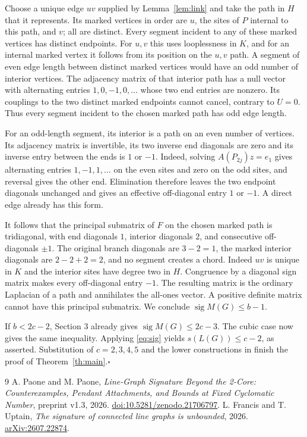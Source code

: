 \documentclass[11pt]{article}
\newcommand{\sg}{\operatorname{sig}}
\begin{document}
Choose a unique edge $uv$ supplied by Lemma~\ref{lem:link} and take the path in $H$ that it represents. Its marked vertices in order are $u$, the sites of $P$ internal to this path, and $v$; all are distinct. Every segment incident to any of these marked vertices has distinct endpoints. For $u,v$ this uses looplessness in $K$, and for an internal marked vertex it follows from its position on the $u,v$ path. A segment of even edge length between distinct marked vertices would have an odd number of interior vertices. The adjacency matrix of that interior path has a null vector with alternating entries $1,0,-1,0,\ldots$ whose two end entries are nonzero. Its couplings to the two distinct marked endpoints cannot cancel, contrary to $U=0$. Thus every segment incident to the chosen marked path has odd edge length.

For an odd-length segment, its interior is a path on an even number of vertices. Its adjacency matrix is invertible, its two inverse end diagonals are zero and its inverse entry between the ends is $1$ or $-1$. Indeed, solving $A(P_{2j})z=e_1$ gives alternating entries $1,-1,1,\ldots$ on the even sites and zero on the odd sites, and reversal gives the other end. Elimination therefore leaves the two endpoint diagonals unchanged and gives an effective off-diagonal entry $1$ or $-1$. A direct edge already has this form.

It follows that the principal submatrix of $F$ on the chosen marked path is tridiagonal, with end diagonals $1$, interior diagonals $2$, and consecutive off-diagonals $\pm1$. The original branch diagonals are $3-2=1$, the marked interior diagonals are $2-2+2=2$, and no segment creates a chord. Indeed $uv$ is unique in $K$ and the interior sites have degree two in $H$. Congruence by a diagonal sign matrix makes every off-diagonal entry $-1$. The resulting matrix is the ordinary Laplacian of a path and annihilates the all-ones vector. A positive definite matrix cannot have this principal submatrix. We conclude $\sg M(G)\le b-1$.

If $b<2c-2$, Section 3 already gives $\sg M(G)\le2c-3$. The cubic case now gives the same inequality. Applying \eqref{eq:sig} yields $s(L(G))\le c-2$, as asserted. Substitution of $c=2,3,4,5$ and the lower constructions in \cite{pp} finish the proof of Theorem~\ref{th:main}.\hfill$\square$

\begin{thebibliography}{9}
 A. Paone and M. Paone, \emph{Line-Graph Signature Beyond the 2-Core: Counterexamples, Pendant Attachments, and Bounds at Fixed Cyclomatic Number}, preprint v1.3, 2026. \href{https://doi.org/10.5281/zenodo.21706797}{doi:10.5281/zenodo.21706797}.
 L. Francis and T. Uptain, \emph{The signature of connected line graphs is unbounded}, 2026. \href{https://arxiv.org/abs/2607.22874}{arXiv:2607.22874}.
\end{thebibliography}
\end{document}
